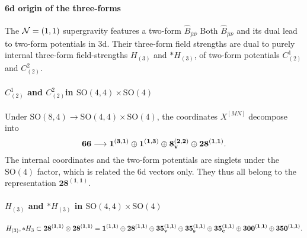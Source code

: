 \documentclass[11pt]{article}
\newcommand{\SO}{\ensuremath{\mathrm{SO}}\xspace}
\begin{document}
  \paragraph{6d origin of the three-forms} The ${\cal N}=(1,1)$ supergravity features a two-form $\hat{B}_{\hat\mu\hat\nu}$ Both $\hat{B}_{\hat\mu\hat\nu}$ and its dual lead to two-form potentials in 3d. Their three-form field strengths are dual to purely internal three-form field-strengths $H_{(3)}$ and $*H_{(3)}$, of two-form potentials $C_{(2)}^{1}$ and $C_{(2)}^{2}$.

  \paragraph{\boldmath $C_{(2)}^{1}$ and $C_{(2)}^{2}$in $\SO(4,4)\times\SO(4)$}
  Under $\SO(8,4)\longrightarrow\SO(4,4)\times \SO(4)$, the coordinates $X^{[MN]}$ decompose into
  \begin{equation}  
    \bm{66} \longrightarrow \bm{1}^{(\bm{3},\bm{1})} \oplus \bm{1}^{(\bm{1},\bm{3})} \oplus \bm{8_{\rm v}}^{(\bm{2},\bm{2})} \oplus \bm{28}^{(\bm{1},\bm{1})}.
  \end{equation}
  The internal coordinates and the two-form potentials are singlets under the $\SO(4)$ factor, which is related the 6d vectors only. They thus all belong to the representation $\bm{28}^{(\bm{1},\bm{1})}$.

  \paragraph{\boldmath $H_{(3)}$ and $*H_{(3)}$ in $\SO(4,4)\times\SO(4)$}
  \begin{equation}
    H_{(3)}, *H_{3}\subset\bm{28}^{(\bm{1},\bm{1})}\otimes\bm{28}^{(\bm{1},\bm{1})}=\bm{1}^{(\bm{1},\bm{1})}\oplus\bm{28}^{(\bm{1},\bm{1})}\oplus\bm{35_{\rm v}}^{(\bm{1},\bm{1})}\oplus\bm{35_{\rm s}}^{(\bm{1},\bm{1})}\oplus\bm{35_{\rm c}}^{(\bm{1},\bm{1})}\oplus\bm{300}^{(\bm{1},\bm{1})}\oplus\bm{350}^{(\bm{1},\bm{1})}.
  \end{equation}
\end{document}
